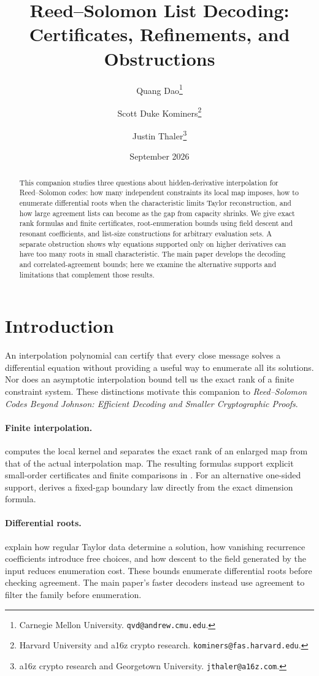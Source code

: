 \documentclass[11pt,letterpaper]{article}
\author{
  Quang Dao\thanks{Carnegie Mellon University. \texttt{qvd@andrew.cmu.edu}.}
  \and
  Scott Duke Kominers\thanks{Harvard University and a16z crypto research.
    \texttt{kominers@fas.harvard.edu}.}
  \and
  Justin Thaler\thanks{a16z crypto research and Georgetown University.
    \texttt{jthaler@a16z.com}.}
}
\date{September 2026}
\title{\bfseries Reed--Solomon List Decoding:\\
Certificates, Refinements, and Obstructions}
\theoremstyle{definition}
\begin{document}
\maketitle
\begin{abstract}
This companion studies three questions about hidden-derivative interpolation
for Reed--Solomon codes: how many independent constraints its local map
imposes, how to enumerate differential roots when the characteristic limits
Taylor reconstruction, and how large agreement lists can become as the gap
from capacity shrinks. We give exact rank formulas and finite certificates,
root-enumeration bounds using field descent and resonant coefficients, and
list-size constructions for arbitrary evaluation sets. A separate obstruction
shows why equations supported only on higher derivatives can have too many
roots in small characteristic. The main paper develops the decoding and
correlated-agreement bounds; here we examine the alternative supports and
limitations that complement those results.
\end{abstract}
\section{Introduction}
\label{sec:companion-introduction}

An interpolation polynomial can certify that every close message solves a
differential equation without providing a useful way to enumerate all its
solutions. Nor does an asymptotic interpolation bound tell us the exact rank
of a finite constraint system. These distinctions motivate this companion
to \emph{Reed--Solomon Codes Beyond Johnson: Efficient Decoding and Smaller
Cryptographic Proofs}.

\paragraph{Finite interpolation.}
 computes the local kernel and separates the
exact rank of an enlarged map from that of the actual interpolation map.
The resulting formulas support explicit small-order certificates and finite
comparisons in .
For an alternative one-sided support, 
derives a fixed-gap boundary law directly from the exact dimension formula.

\paragraph{Differential roots.}
 explain how regular Taylor data
determine a solution, how vanishing recurrence coefficients introduce free
choices, and how descent to the field generated by the input reduces
enumeration cost. These bounds enumerate differential roots before checking
agreement. The main paper's faster decoders instead use agreement to filter
the family before enumeration.
\end{document}
